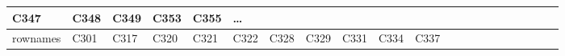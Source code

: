 \documentclass[
]{article}
\begin{document}
\begin{longtable}[]{@{}lllllllllllllllllllll@{}}
\begin{minipage}[b]{0.03\columnwidth}
C347\strut
\end{minipage} & \begin{minipage}[b]{0.03\columnwidth}\raggedright
C348\strut
\end{minipage} & \begin{minipage}[b]{0.03\columnwidth}\raggedright
C349\strut
\end{minipage} & \begin{minipage}[b]{0.03\columnwidth}\raggedright
C353\strut
\end{minipage} & \begin{minipage}[b]{0.03\columnwidth}\raggedright
C355\strut
\end{minipage} & \begin{minipage}[b]{0.01\columnwidth}\raggedright
\ldots{}\strut
\end{minipage}\tabularnewline
\midrule
\endfirsthead
\toprule
\begin{minipage}[b]{0.03\columnwidth}\raggedright
rownames\strut
\end{minipage} & \begin{minipage}[b]{0.03\columnwidth}\raggedright
C301\strut
\end{minipage} & \begin{minipage}[b]{0.03\columnwidth}\raggedright
C317\strut
\end{minipage} & \begin{minipage}[b]{0.03\columnwidth}\raggedright
C320\strut
\end{minipage} & \begin{minipage}[b]{0.03\columnwidth}\raggedright
C321\strut
\end{minipage} & \begin{minipage}[b]{0.03\columnwidth}\raggedright
C322\strut
\end{minipage} & \begin{minipage}[b]{0.03\columnwidth}\raggedright
C328\strut
\end{minipage} & \begin{minipage}[b]{0.03\columnwidth}\raggedright
C329\strut
\end{minipage} & \begin{minipage}[b]{0.03\columnwidth}\raggedright
C331\strut
\end{minipage} & \begin{minipage}[b]{0.03\columnwidth}\raggedright
C334\strut
\end{minipage} & \begin{minipage}[b]{0.03\columnwidth}\raggedright
C337\strut
\end{minipage} & \begin{minipage}[b]{0.03\columnwidth}\raggedright

\end{minipage}
\end{longtable}
\end{document}
